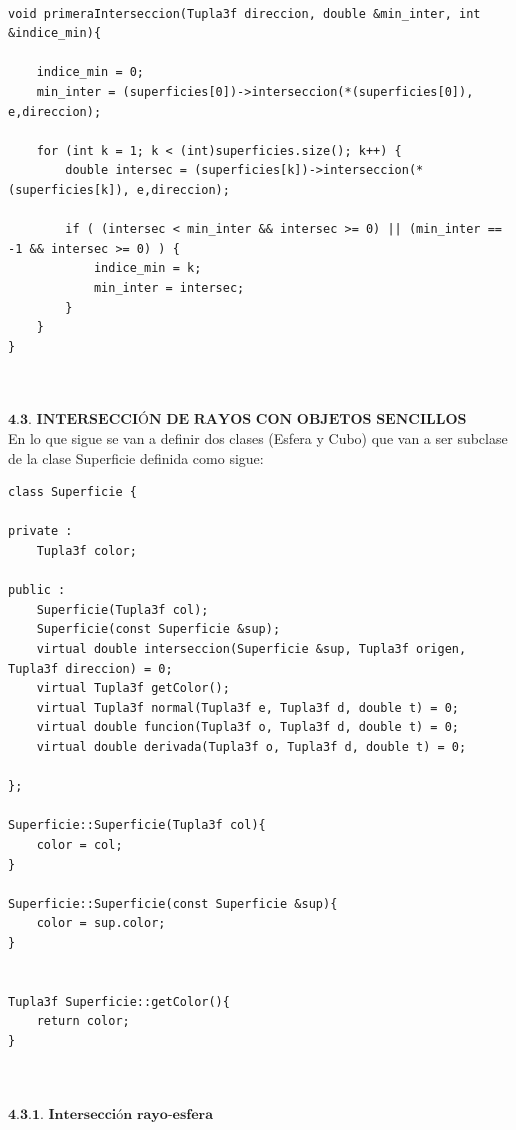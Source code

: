 \begin{lstlisting}[style=Consola]

void primeraInterseccion(Tupla3f direccion, double &min_inter, int &indice_min){

	indice_min = 0;
	min_inter = (superficies[0])->interseccion(*(superficies[0]), e,direccion);

	for (int k = 1; k < (int)superficies.size(); k++) {
		double intersec = (superficies[k])->interseccion(*(superficies[k]), e,direccion);

		if ( (intersec < min_inter && intersec >= 0) || (min_inter == -1 && intersec >= 0) ) {
			indice_min = k;
			min_inter = intersec;
		}
	}
}
\end{lstlisting}
${ }$\\

${ }$\\
$\textbf{4.3. INTERSECCIÓN DE RAYOS CON OBJETOS SENCILLOS}$
${ }$\\

En lo que sigue se van a definir dos clases (Esfera y Cubo) que van a ser subclase de la clase Superficie definida como sigue:

\begin{lstlisting}[style=Consola]
class Superficie {

private :
	Tupla3f color;

public :
	Superficie(Tupla3f col);
	Superficie(const Superficie &sup);
	virtual double interseccion(Superficie &sup, Tupla3f origen, Tupla3f direccion) = 0;
	virtual Tupla3f getColor();
	virtual Tupla3f normal(Tupla3f e, Tupla3f d, double t) = 0;
	virtual double funcion(Tupla3f o, Tupla3f d, double t) = 0;
	virtual double derivada(Tupla3f o, Tupla3f d, double t) = 0;

};

Superficie::Superficie(Tupla3f col){
	color = col;
}

Superficie::Superficie(const Superficie &sup){
	color = sup.color;
}


Tupla3f Superficie::getColor(){
	return color;
}

\end{lstlisting}
${ }$\\

${ }$\\
$\textbf{4.3.1. Intersección rayo-esfera}$
${ }$\\

